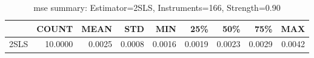 \begin{table}[ht]
\centering
\caption{mse summary: Estimator=2SLS, Instruments=166, Strength=0.90}
\begin{tabular}{lrrrrrrrr}
\toprule
 & COUNT & MEAN & STD & MIN & 25\% & 50\% & 75\% & MAX \\
\midrule
2SLS & 10.0000 & 0.0025 & 0.0008 & 0.0016 & 0.0019 & 0.0023 & 0.0029 & 0.0042 \\
\bottomrule
\end{tabular}
\end{table}
